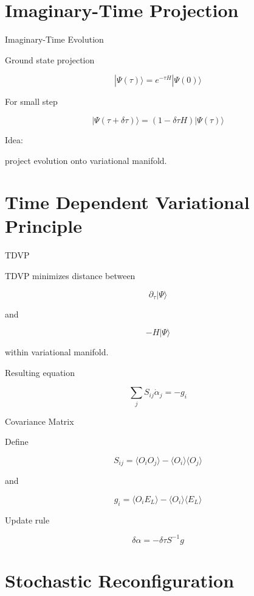 \documentclass{beamer}
\begin{document}
\section{Imaginary-Time Projection}

\begin{frame}{Imaginary-Time Evolution}

Ground state projection

\[
|\Psi(\tau)\rangle =
e^{-\tau H} |\Psi(0)\rangle
\]

For small step

\[
|\Psi(\tau+\delta\tau)\rangle
=
(1-\delta\tau H)|\Psi(\tau)\rangle
\]

Idea:

project evolution onto variational manifold.
\end{frame}

\section{Time Dependent Variational Principle}

\begin{frame}{TDVP}

TDVP minimizes distance between

\[
\partial_\tau |\Psi\rangle
\]

and

\[
-H|\Psi\rangle
\]

within variational manifold.

Resulting equation

\[
\sum_j S_{ij} \dot{\alpha}_j = -g_i
\]
\end{frame}

\begin{frame}{Covariance Matrix}

Define

\[
S_{ij}
=
\langle O_i O_j\rangle
-
\langle O_i\rangle\langle O_j\rangle
\]

and

\[
g_i =
\langle O_i E_L\rangle
-
\langle O_i\rangle\langle E_L\rangle
\]

Update rule

\[
\delta\alpha = -\delta\tau S^{-1} g
\]
\end{frame}

\section{Stochastic Reconfiguration}
\end{document}
